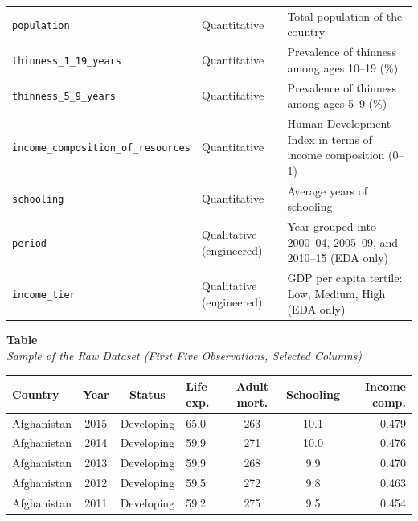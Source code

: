 \documentclass[12pt,a4paper]{article}
\begin{document}
{\begin{tabularx}{\textwidth}{l l X}
\texttt{population} & Quantitative & Total population of the country\\
\texttt{thinness\_1\_19\_years} & Quantitative & Prevalence of thinness among ages 10--19 (\%)\\
\texttt{thinness\_5\_9\_years} & Quantitative & Prevalence of thinness among ages 5--9 (\%)\\
\texttt{income\_composition\_of\_resources} & Quantitative & Human Development Index in terms of income composition (0--1)\\
\texttt{schooling} & Quantitative & Average years of schooling\\
\texttt{period} & Qualitative (engineered) & Year grouped into 2000--04, 2005--09, and 2010--15 (EDA only)\\
\texttt{income\_tier} & Qualitative (engineered) & GDP per capita tertile: Low, Medium, High (EDA only)\\\bottomrule
\end{tabularx}\par}
\vspace{4pt}

\vspace{0.7cm}

\noindent\begin{minipage}{\textwidth}
\label{tab:rawsample}
\noindent\textbf{Table \thetable}\\
\emph{Sample of the Raw Dataset (First Five Observations, Selected Columns)}
\vspace{4pt}
\begin{center}
\singlespacing\small
\begin{tabular}{lcclccr}\toprule
\textbf{Country} & \textbf{Year} & \textbf{Status} & \textbf{Life exp.} & \textbf{Adult mort.} & \textbf{Schooling} & \textbf{Income comp.}\\\midrule
Afghanistan & 2015 & Developing & 65.0 & 263 & 10.1 & 0.479\\
Afghanistan & 2014 & Developing & 59.9 & 271 & 10.0 & 0.476\\
Afghanistan & 2013 & Developing & 59.9 & 268 & 9.9 & 0.470\\
Afghanistan & 2012 & Developing & 59.5 & 272 & 9.8 & 0.463\\
Afghanistan & 2011 & Developing & 59.2 & 275 & 9.5 & 0.454\\\bottomrule
\end{tabular}
\end{center}
\vspace{2pt}
\end{minipage}
\end{document}
